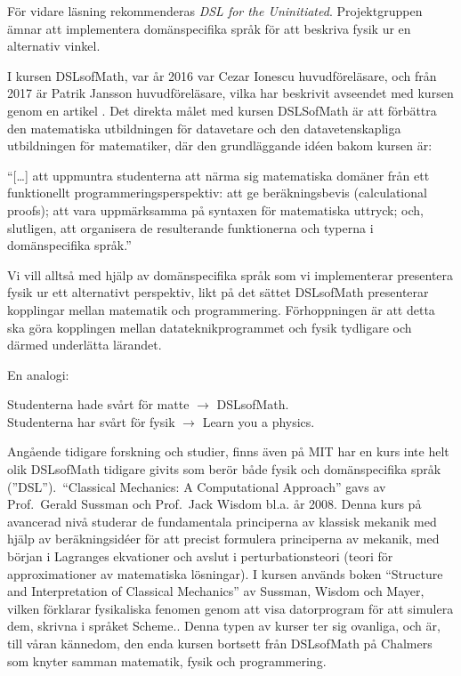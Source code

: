 \begin{draft}
För vidare läsning
rekommenderas \textit{DSL for the Uninitiated}.\cite{DSLU} Projektgruppen ämnar att implementera 
domänspecifika språk för att beskriva fysik ur en alternativ vinkel.

I kursen DSLsofMath, var år 2016 var Cezar Ionescu huvudföreläsare, och från 2017 är Patrik Jansson
huvudföreläsare, vilka har beskrivit avseendet med kursen genom en artikel \cite{tfpie2015}. Det direkta målet 
med kursen DSLSofMath är att förbättra den matematiska utbildningen för datavetare och den
datavetenskapliga utbildningen för matematiker, där den grundläggande idéen bakom kursen är: 

\begin{center}
  ``[\dots] att uppmuntra studenterna att närma sig matematiska domäner från ett
  funktionellt programmeringsperspektiv: att ge beräkningsbevis (calculational
  proofs); att vara uppmärksamma på syntaxen för matematiska uttryck; och,
  slutligen, att organisera de resulterande funktionerna och typerna i
  domänspecifika språk.''\cite{lecture-notes}\cite{tfpie2015} 
\end{center}

Vi vill alltså med hjälp av domänspecifika språk som vi implementerar presentera fysik ur ett alternativt perspektiv, likt
på det sättet DSLsofMath presenterar kopplingar mellan matematik och programmering. Förhoppningen är att detta ska göra kopplingen mellan datateknikprogrammet och fysik tydligare och därmed underlätta lärandet.


En analogi:

Studenterna hade svårt för matte $\rightarrow $ DSLsofMath.\\
Studenterna har svårt för fysik $\rightarrow $ Learn you a physics.


Angående tidigare forskning och studier, finns även på MIT har en kurs inte helt olik DSLsofMath tidigare givits som berör både
fysik och domänspecifika språk (''DSL'').\ ``Classical Mechanics: A Computational Approach'' gavs av
Prof.\ Gerald Sussman och Prof.\ Jack Wisdom bl.a. år
2008.\cite{classical-mechanics-course-mit-2008}
Denna kurs på avancerad nivå studerar de fundamentala principerna av klassisk
mekanik med hjälp av beräkningsidéer för att precist formulera principerna av
mekanik, med början i Lagranges ekvationer och avslut i
perturbationsteori (teori för approximationer av matematiska lösningar). I kursen används boken ``Structure and %
Interpretation of Classical Mechanics'' av Sussman, Wisdom och Mayer,
vilken förklarar fysikaliska fenomen genom att visa datorprogram för att
simulera dem, skrivna i språket Scheme.\cite{SICM}. Denna typen av kurser ter sig ovanliga, och är, till våran kännedom, den enda kursen bortsett från DSLsofMath på Chalmers som knyter samman matematik, fysik och programmering.


\end{draft}
